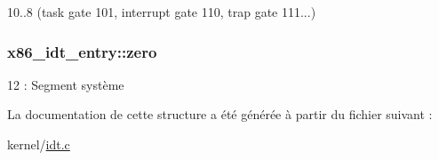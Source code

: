 10..8 (task gate 101, interrupt gate 110, trap gate 111...) \hypertarget{structx86__idt__entry_ac291c67a44d2457bda76146d1bc5e920}{
\subsubsection[{zero}]{ x86\+\_\+idt\+\_\+entry\+::zero}}\label{structx86__idt__entry_ac291c67a44d2457bda76146d1bc5e920}
12 \+: Segment système 

La documentation de cette structure a été générée à partir du fichier suivant \+:\begin{DoxyCompactItemize}
\item 
kernel/\hyperlink{idt_8c}{idt.\+c}\end{DoxyCompactItemize}
